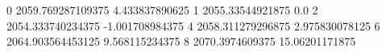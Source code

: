 0 2059.769287109375 4.433837890625
1 2055.33544921875 0.0
2 2054.333740234375 -1.001708984375
4 2058.311279296875 2.975830078125
6 2064.903564453125 9.568115234375
8 2070.3974609375 15.06201171875
